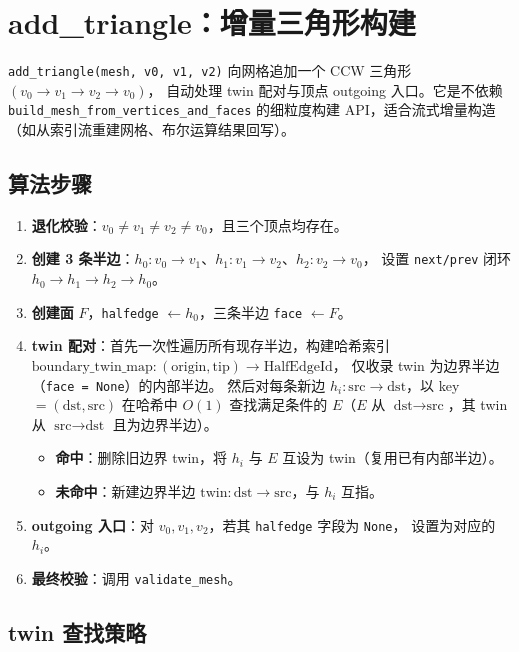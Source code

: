 \documentclass[11pt,a4paper]{article}
\begin{document}
\section{add\_triangle：增量三角形构建}

\texttt{add\_triangle(mesh, v0, v1, v2)} 向网格追加一个 CCW 三角形 $(v_0 \to v_1 \to v_2 \to v_0)$，
自动处理 twin 配对与顶点 outgoing 入口。它是不依赖 \texttt{build\_mesh\_from\_vertices\_and\_faces}
的细粒度构建 API，适合流式增量构造（如从索引流重建网格、布尔运算结果回写）。

\subsection{算法步骤}

\begin{enumerate}
  \item \textbf{退化校验}：$v_0 \neq v_1 \neq v_2 \neq v_0$，且三个顶点均存在。
  \item \textbf{创建 3 条半边}：$h_0: v_0 \to v_1$、$h_1: v_1 \to v_2$、$h_2: v_2 \to v_0$，
        设置 \texttt{next/prev} 闭环 $h_0 \to h_1 \to h_2 \to h_0$。
  \item \textbf{创建面} $F$，\texttt{halfedge} $\leftarrow h_0$，三条半边 \texttt{face} $\leftarrow F$。
  \item \textbf{twin 配对}：首先一次性遍历所有现存半边，构建哈希索引
        $\text{boundary\_twin\_map}: (\text{origin}, \text{tip}) \to \text{HalfEdgeId}$，
        仅收录 twin 为边界半边（\texttt{face = None}）的内部半边。
        然后对每条新边 $h_i: \text{src} \to \text{dst}$，以 key $= (\text{dst}, \text{src})$
        在哈希中 $O(1)$ 查找满足条件的 $E$（$E$ 从 $\text{dst} \to \text{src}$，其 twin 从 $\text{src} \to \text{dst}$ 且为边界半边）。
        \begin{itemize}
          \item \textbf{命中}：删除旧边界 twin，将 $h_i$ 与 $E$ 互设为 twin（复用已有内部半边）。
          \item \textbf{未命中}：新建边界半边 $\text{twin}: \text{dst} \to \text{src}$，与 $h_i$ 互指。
        \end{itemize}
  \item \textbf{outgoing 入口}：对 $v_0, v_1, v_2$，若其 \texttt{halfedge} 字段为 \texttt{None}，
        设置为对应的 $h_i$。
  \item \textbf{最终校验}：调用 \texttt{validate\_mesh}。
\end{enumerate}

\subsection{twin 查找策略}
\end{document}
